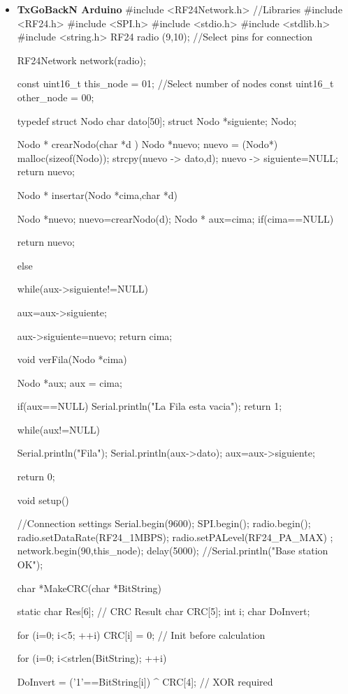 \documentclass[journal,trans]{IEEEtran}
\begin{document}
\begin{itemize}

\item \textbf{TxGoBackN Arduino}
#include <RF24Network.h>          //Libraries
#include <RF24.h>
#include <SPI.h>
#include <stdio.h>
#include <stdlib.h>
#include <string.h>
RF24 radio (9,10);                 //Select pins for connection

RF24Network network(radio);

const uint16_t this_node = 01;      //Select number of nodes
const uint16_t other_node = 00;

typedef struct Nodo
{
    char dato[50];
    struct Nodo *siguiente;
} Nodo;

Nodo * crearNodo(char *d )
{
    Nodo *nuevo;
    nuevo = (Nodo*) malloc(sizeof(Nodo));
   strcpy(nuevo -> dato,d);
    nuevo -> siguiente=NULL;
    return nuevo;
}

Nodo * insertar(Nodo *cima,char *d)
{
    Nodo *nuevo;
    nuevo=crearNodo(d);
 Nodo * aux=cima;
    if(cima==NULL){
    return nuevo;

    }else{
      while(aux->siguiente!=NULL){

        aux=aux->siguiente;


      }
      aux->siguiente=nuevo;
      return cima;
    }
}

void verFila(Nodo *cima)
{
    Nodo *aux;
    aux = cima;

   if(aux==NULL)
    {
        Serial.println("La Fila esta vacia");
        return 1;
    }

    while(aux!=NULL)
    {

        Serial.println("Fila");
        Serial.println(aux->dato);
        aux=aux->siguiente;
    }
    return 0;
}



void setup() {                      //Connection settings
  Serial.begin(9600);
  SPI.begin();
  radio.begin();
radio.setDataRate(RF24_1MBPS);
radio.setPALevel(RF24_PA_MAX) ;
  network.begin(90,this_node);
  delay(5000);
  //Serial.println("Base station OK");
  
}


char *MakeCRC(char *BitString)
   {
   static char Res[6];                                 // CRC Result
   char CRC[5];
   int  i;
   char DoInvert;
   
   for (i=0; i<5; ++i)  CRC[i] = 0;                    // Init before calculation
   
   for (i=0; i<strlen(BitString); ++i)
      {
      DoInvert = ('1'==BitString[i]) ^ CRC[4];         // XOR required

}}
\end{itemize}
\end{document}
